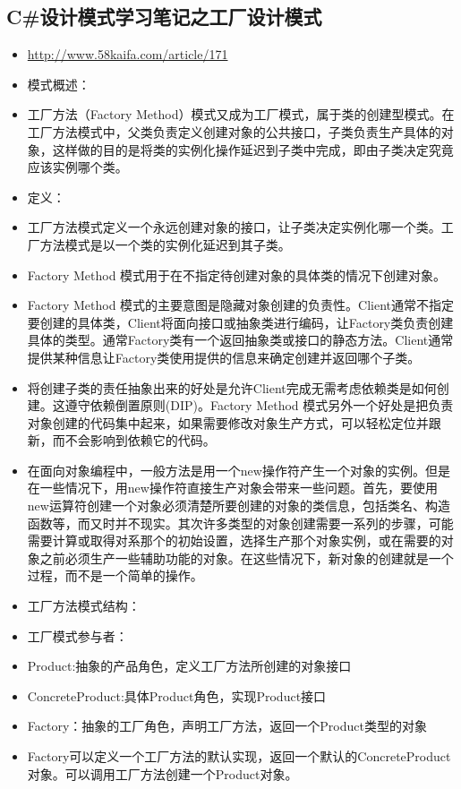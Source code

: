 \documentclass[9pt, b5paper]{article}
\begin{document}
\subsection{C\#设计模式学习笔记之工厂设计模式}
\label{sec:org7441f38}
\begin{itemize}
\item \url{http://www.58kaifa.com/article/171}
\item 模式概述：
\item 工厂方法（Factory Method）模式又成为工厂模式，属于类的创建型模式。在工厂方法模式中，父类负责定义创建对象的公共接口，子类负责生产具体的对象，这样做的目的是将类的实例化操作延迟到子类中完成，即由子类决定究竟应该实例哪个类。
\item 定义：
\item 工厂方法模式定义一个永远创建对象的接口，让子类决定实例化哪一个类。工厂方法模式是以一个类的实例化延迟到其子类。
\item Factory Method 模式用于在不指定待创建对象的具体类的情况下创建对象。
\item Factory Method 模式的主要意图是隐藏对象创建的负责性。Client通常不指定要创建的具体类，Client将面向接口或抽象类进行编码，让Factory类负责创建具体的类型。通常Factory类有一个返回抽象类或接口的静态方法。Client通常提供某种信息让Factory类使用提供的信息来确定创建并返回哪个子类。
\item 将创建子类的责任抽象出来的好处是允许Client完成无需考虑依赖类是如何创建。这遵守依赖倒置原则(DIP)。Factory Method 模式另外一个好处是把负责对象创建的代码集中起来，如果需要修改对象生产方式，可以轻松定位并跟新，而不会影响到依赖它的代码。
\item 在面向对象编程中，一般方法是用一个new操作符产生一个对象的实例。但是在一些情况下，用new操作符直接生产对象会带来一些问题。首先，要使用new运算符创建一个对象必须清楚所要创建的对象的类信息，包括类名、构造函数等，而又时并不现实。其次许多类型的对象创建需要一系列的步骤，可能需要计算或取得对系那个的初始设置，选择生产那个对象实例，或在需要的对象之前必须生产一些辅助功能的对象。在这些情况下，新对象的创建就是一个过程，而不是一个简单的操作。
\item 工厂方法模式结构：
\item 工厂模式参与者：
\item Product:抽象的产品角色，定义工厂方法所创建的对象接口
\item ConcreteProduct:具体Product角色，实现Product接口
\item Factory：抽象的工厂角色，声明工厂方法，返回一个Product类型的对象
\item Factory可以定义一个工厂方法的默认实现，返回一个默认的ConcreteProduct对象。可以调用工厂方法创建一个Product对象。

\end{itemize}
\end{document}

